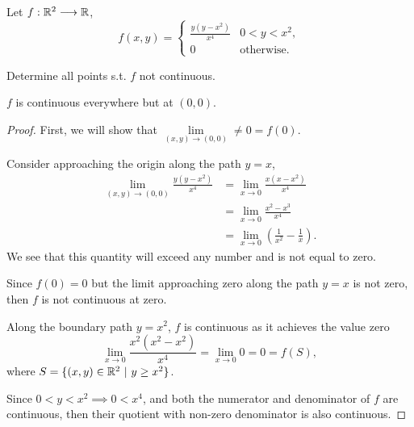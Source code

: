 \documentclass[../hw2]{subfiles}
\begin{document}
\begin{problem}[3]
Let $f:\mathbb{R}^2\longrightarrow\mathbb{R}$,\[
	f(x,y)=\begin{cases}
		\frac{y(y-x^2)}{x^4} & 0<y<x^2,          \\
		0                    & \text{otherwise}.
	\end{cases}
\]

Determine all points s.t. $f$ not continuous.
\end{problem}

\begin{proposition}
	$f$ is continuous everywhere but at $(0,0)$.
\end{proposition}
\begin{proof}
	First, we will show that $\lim\limits_{(x,y)\to(0,0)}\neq 0 = f(0)$.

	Consider approaching the origin along the path $y=x$,
	\begin{align*}
		\lim\limits_{(x,y)\to(0,0)}\frac{y(y-x^2)}{x^4} & = \lim\limits_{x\to 0} \frac{x(x-x^2)}{x^4}                    \\
		                                                & = \lim\limits_{x\to 0} \frac{x^2-x^3}{x^4}                     \\
		                                                & = \lim\limits_{x\to 0}\left( \frac{1}{x^2}-\frac{1}{x} \right)
		.\end{align*}
	We see that this quantity will exceed any number and is not equal to zero.

	Since $f(0)=0$ but the limit approaching zero along the path  $y=x$ is not zero, then  $f$ is not continuous at zero.

	Along the boundary path $y=x^2$, $f$ is continuous as it achieves the value zero  \[
		\lim\limits_{x\to 0}\frac{x^2(x^2-x^2)}{x^4}=\lim\limits_{x\to 0}0=0=f(S)
		,\] where $S=\{(x,y)\in \mathbb{R}^{2}\ |\ y\ge x^2\}$.

	Since $0<y<x^2\implies 0<x^4$, and both the numerator and denominator of $f$ are continuous, then their quotient with non-zero denominator is also continuous.

\end{proof}
\end{document}

